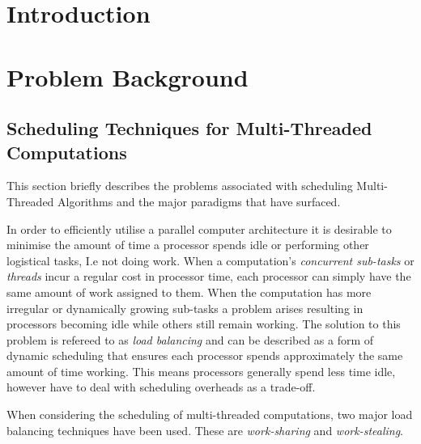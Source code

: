 \chapter{Introduction}

\chapter{Problem Background}

\section{Scheduling Techniques for Multi-Threaded Computations}
This section briefly describes the problems associated with scheduling Multi-Threaded Algorithms and 
the major paradigms that have surfaced.

In order to efficiently utilise a parallel computer architecture it is desirable to minimise
the amount of time a processor spends idle or performing other logistical tasks, I.e not doing work. 
When a computation's \textit{concurrent sub-tasks} or \textit{threads} incur a regular cost in processor
time, each processor can simply have the same amount of work assigned to them. When the computation has
more irregular or dynamically growing sub-tasks a problem arises resulting in 
processors becoming idle while others still remain working. The solution to this problem is refereed to as
\textit{load balancing} and can be described as a form of dynamic scheduling that ensures each processor 
spends approximately the same amount of time working. This means processors generally spend
less time idle, however have to deal with scheduling overheads as a trade-off.

When considering the scheduling of multi-threaded computations, two major load balancing techniques have been used.
These are \textit{work-sharing} and \textit{work-stealing}.


